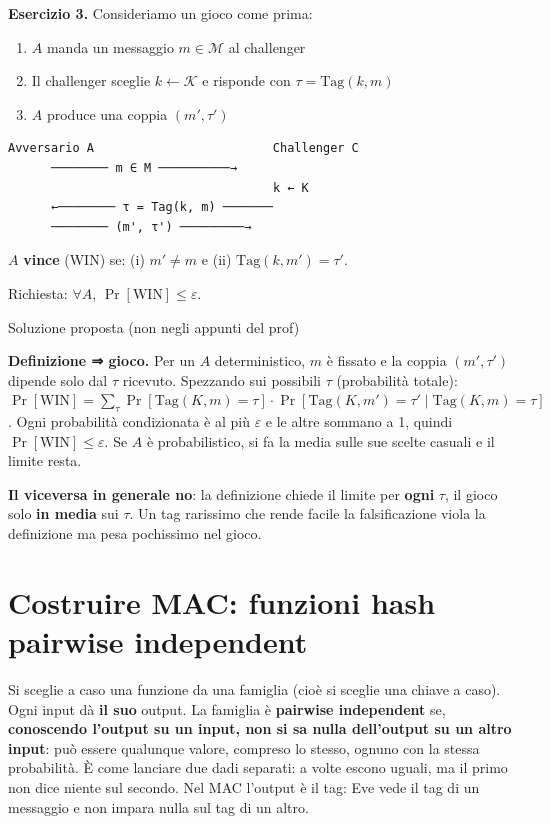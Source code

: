 \textbf{Esercizio 3.} Consideriamo un gioco come prima:

\begin{enumerate}
\def\labelenumi{\arabic{enumi}.}
\tightlist
\item
  \(A\) manda un messaggio \(m \in \mathcal{M}\) al challenger
\item
  Il challenger sceglie \(k \leftarrow \mathcal{K}\) e risponde con \(\tau = \text{Tag}(k, m)\)
\item
  \(A\) produce una coppia \((m', \tau')\)
\end{enumerate}

\begin{verbatim}
Avversario A                         Challenger C
      ──────── m ∈ M ──────────→
                                     k ← K
      ←──────── τ = Tag(k, m) ───────
      ──────── (m', τ') ─────────→
\end{verbatim}

\(A\) \textbf{vince} (WIN) se: (i) \(m' \ne m\) e (ii) \(\text{Tag}(k, m') = \tau'\).

Richiesta: \(\forall A\), \(\Pr[\text{WIN}] \le \varepsilon\).

\begin{approfondimento}{Soluzione proposta (non negli appunti del prof)}

\textbf{Definizione ⇒ gioco.} Per un \(A\) deterministico, \(m\) è fissato e la coppia \((m', \tau')\) dipende solo dal \(\tau\) ricevuto. Spezzando sui possibili \(\tau\) (probabilità totale): \(\Pr[\text{WIN}] = \sum_\tau \Pr[\text{Tag}(K, m) = \tau] \cdot \Pr[\text{Tag}(K, m') = \tau' \mid \text{Tag}(K, m) = \tau]\). Ogni probabilità condizionata è al più \(\varepsilon\) e le altre sommano a 1, quindi \(\Pr[\text{WIN}] \le \varepsilon\). Se \(A\) è probabilistico, si fa la media sulle sue scelte casuali e il limite resta.

\textbf{Il viceversa in generale no}: la definizione chiede il limite per \textbf{ogni} \(\tau\), il gioco solo \textbf{in media} sui \(\tau\). Un tag rarissimo che rende facile la falsificazione viola la definizione ma pesa pochissimo nel gioco.

\end{approfondimento}

\section{Costruire MAC: funzioni hash pairwise independent}

\begin{inbreve}

Si sceglie a caso una funzione da una famiglia (cioè si sceglie una chiave a caso). Ogni input dà \textbf{il suo} output. La famiglia è \textbf{pairwise independent} se, \textbf{conoscendo l'output su un input, non si sa nulla dell'output su un altro input}: può essere qualunque valore, compreso lo stesso, ognuno con la stessa probabilità. È come lanciare due dadi separati: a volte escono uguali, ma il primo non dice niente sul secondo. Nel MAC l'output è il tag: Eve vede il tag di un messaggio e non impara nulla sul tag di un altro.

\end{inbreve}

